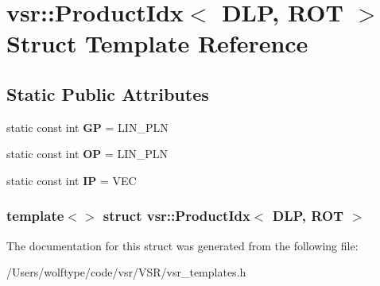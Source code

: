 \hypertarget{structvsr_1_1_product_idx_3_01_d_l_p_00_01_r_o_t_01_4}{\section{vsr\-:\-:Product\-Idx$<$ D\-L\-P, R\-O\-T $>$ Struct Template Reference}
\label{structvsr_1_1_product_idx_3_01_d_l_p_00_01_r_o_t_01_4}
}
\subsection*{Static Public Attributes}
\begin{DoxyCompactItemize}
\item 
\hypertarget{structvsr_1_1_product_idx_3_01_d_l_p_00_01_r_o_t_01_4_ad28c4788288b5b80fbd232025ac10af4}{static const int {\bfseries G\-P} = L\-I\-N\-\_\-\-P\-L\-N}\label{structvsr_1_1_product_idx_3_01_d_l_p_00_01_r_o_t_01_4_ad28c4788288b5b80fbd232025ac10af4}

\item 
\hypertarget{structvsr_1_1_product_idx_3_01_d_l_p_00_01_r_o_t_01_4_aeaafe7d83b0e82a536447f7dab094ba3}{static const int {\bfseries O\-P} = L\-I\-N\-\_\-\-P\-L\-N}\label{structvsr_1_1_product_idx_3_01_d_l_p_00_01_r_o_t_01_4_aeaafe7d83b0e82a536447f7dab094ba3}

\item 
\hypertarget{structvsr_1_1_product_idx_3_01_d_l_p_00_01_r_o_t_01_4_a12a0a4e516853d83bb43c638b38e3bed}{static const int {\bfseries I\-P} = V\-E\-C}\label{structvsr_1_1_product_idx_3_01_d_l_p_00_01_r_o_t_01_4_a12a0a4e516853d83bb43c638b38e3bed}

\end{DoxyCompactItemize}
\subsubsection*{template$<$$>$ struct vsr\-::\-Product\-Idx$<$ D\-L\-P, R\-O\-T $>$}



The documentation for this struct was generated from the following file\-:\begin{DoxyCompactItemize}
\item 
/\-Users/wolftype/code/vsr/\-V\-S\-R/vsr\-\_\-templates.\-h\end{DoxyCompactItemize}
